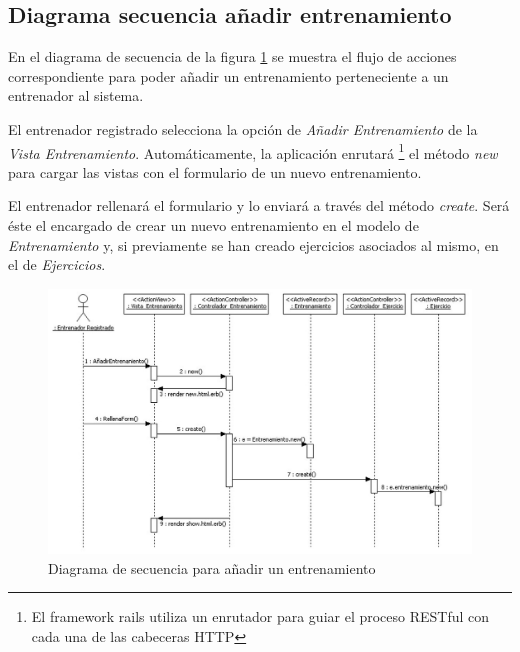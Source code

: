 			\newpage
		
		\subsection{Diagrama secuencia añadir entrenamiento} %
		  \label{sub:diagrama_secuencia_anadir_entrenamiento}
		  
		  En el diagrama de secuencia de la figura \ref{fig:di_sec_anadirentrenamiento} se muestra el flujo de acciones correspondiente para poder añadir un entrenamiento perteneciente a un entrenador al sistema.
		  
		  El entrenador registrado selecciona la opción de {\it Añadir Entrenamiento} de la {\it Vista Entrenamiento}. Automáticamente, la aplicación enrutará \footnote{El framework rails utiliza un enrutador para guiar el proceso RESTful con cada una de las cabeceras HTTP} el método {\it new} para cargar las vistas con el formulario de un nuevo entrenamiento.
		  
		  El entrenador rellenará el formulario y lo enviará a través del método {\it create}. Será éste el encargado de crear un nuevo entrenamiento en el modelo de {\it Entrenamiento} y, si previamente se han creado ejercicios asociados al mismo, en el de {\it Ejercicios}.
		  
		  \begin{figure}[H]
			  \centering
			    \includegraphics[width=15cm]{./eps/di_diagsecuencia/Entrenamiento_Anadir.eps}
			  \caption{Diagrama de secuencia para añadir un entrenamiento}
			  \label{fig:di_sec_anadirentrenamiento}
			\end{figure}
		
